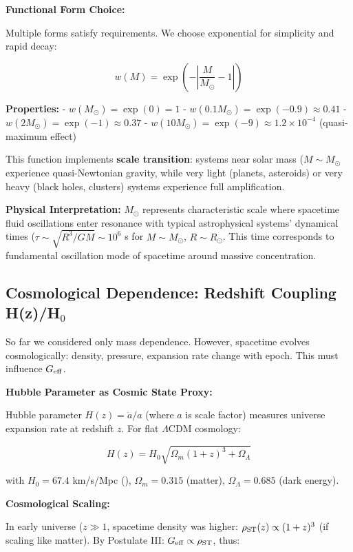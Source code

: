 \documentclass[10pt,a4paper]{article}
\begin{document}
\textbf{Functional Form Choice:}

Multiple forms satisfy requirements. We choose exponential for
simplicity and rapid decay:

\[w(M) = \exp\left(-\left|\frac{M}{M_\odot} - 1\right|\right)\]

\textbf{Properties:} - \(w(M_\odot) = \exp(0) = 1\) \checkmark{} -
\(w(0.1 M_\odot) = \exp(-0.9) \approx 0.41\) -
\(w(2 M_\odot) = \exp(-1) \approx 0.37\) -
\(w(10 M_\odot) = \exp(-9) \approx 1.2 \times 10^{-4}\) (quasi-maximum
effect)

This function implements \textbf{scale transition}: systems near solar
mass (\(M \sim M_\odot\) experience quasi-Newtonian gravity, while very
light (planets, asteroids) or very heavy (black holes, clusters) systems
experience full amplification.

\textbf{Physical Interpretation:} \(M_\odot\) represents characteristic
scale where spacetime fluid oscillations enter resonance with typical
astrophysical systems' dynamical times
(\(\tau \sim \sqrt{R^3/GM} \sim 10^6\) s for \(M \sim M_\odot\),
\(R \sim R_\odot\). This time corresponds to fundamental oscillation
mode of spacetime around massive concentration.

\subsection{Cosmological Dependence: Redshift Coupling H(z)/H$_{0}$}\label{cosmological-dependence-redshift-coupling-hzhux2080}

So far we considered only mass dependence. However, spacetime evolves
cosmologically: density, pressure, expansion rate change with epoch.
This must influence \(G_{\rm eff}\).

\textbf{Hubble Parameter as Cosmic State Proxy:}

Hubble parameter \(H(z) = \dot{a}/a\) (where \(a\) is scale factor)
measures universe expansion rate at redshift \(z\). For flat
\(\Lambda\)CDM cosmology:

\[H(z) = H_0 \sqrt{\Omega_m (1+z)^3 + \Omega_\Lambda}\]

with \(H_0 = 67.4\) km/s/Mpc (\cite{PlanckCollaboration2020a}), \(\Omega_m = 0.315\)
(matter), \(\Omega_\Lambda = 0.685\) (dark energy).

\textbf{Cosmological Scaling:}

In early universe (\(z \gg 1\), spacetime density was higher:
\(\rho_{\rm ST}(z) \propto (1+z)^3\) (if scaling like matter). By
Postulate III: \(G_{\rm eff} \propto \rho_{\rm ST}\), thus:
\end{document}
